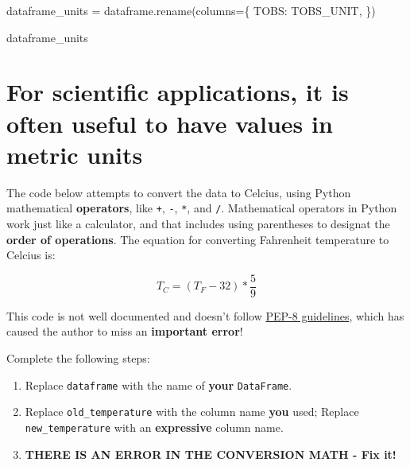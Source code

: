\documentclass[
  letterpaper,
  DIV=11,
  numbers=noendperiod,
  oneside]{scrreprt}
\newenvironment{Shaded}{\begin{snugshade}}{\end{snugshade}}
\newcommand{\NormalTok}[1]{\textcolor[rgb]{0.00,0.23,0.31}{#1}}
\newcommand{\OperatorTok}[1]{\textcolor[rgb]{0.37,0.37,0.37}{#1}}
\newcommand{\StringTok}[1]{\textcolor[rgb]{0.13,0.47,0.30}{#1}}
\providecommand{\tightlist}{%
  \setlength{\itemsep}{0pt}\setlength{\parskip}{0pt}}
\begin{document}
\begin{Shaded}
\begin{Highlighting}[]
\NormalTok{dataframe\_units }\OperatorTok{=}\NormalTok{ dataframe.rename(columns}\OperatorTok{=}\NormalTok{\{}
    \StringTok{\textquotesingle{}TOBS\textquotesingle{}}\NormalTok{: }\StringTok{\textquotesingle{}TOBS\_UNIT\textquotesingle{}}\NormalTok{,}
\NormalTok{\})}

\NormalTok{dataframe\_units}
\end{Highlighting}
\end{Shaded}

\section{For scientific applications, it is often useful to have values
in metric
units}\label{for-scientific-applications-it-is-often-useful-to-have-values-in-metric-units-1}

\begin{tcolorbox}[enhanced jigsaw, colbacktitle=quarto-callout-color!10!white, opacityback=0, bottomtitle=1mm, toptitle=1mm, bottomrule=.15mm, left=2mm, colframe=quarto-callout-color-frame, leftrule=.75mm, opacitybacktitle=0.6, colback=white, rightrule=.15mm, toprule=.15mm, breakable, titlerule=0mm, title=\textcolor{quarto-callout-color}{\faInfo}\hspace{0.5em}{Try It: Convert units}, coltitle=black, arc=.35mm]

The code below attempts to convert the data to Celcius, using Python
mathematical \textbf{operators}, like \texttt{+}, \texttt{-},
\texttt{*}, and \texttt{/}. Mathematical operators in Python work just
like a calculator, and that includes using parentheses to designat the
\textbf{order of operations}. The equation for converting Fahrenheit
temperature to Celcius is:

\[ T_C = (T_F - 32) * \frac{5}{9} \]

This code is not well documented and doesn't follow
\href{https://peps.python.org/pep-0008/\#other-recommendations}{PEP-8
guidelines}, which has caused the author to miss an \textbf{important
error}!

Complete the following steps:

\begin{enumerate}
\def\labelenumi{\arabic{enumi}.}
\tightlist
\item
  Replace \texttt{dataframe} with the name of \textbf{your}
  \texttt{DataFrame}.
\item
  Replace \texttt{\textquotesingle{}old\_temperature\textquotesingle{}}
  with the column name \textbf{you} used; Replace
  \texttt{\textquotesingle{}new\_temperature\textquotesingle{}} with an
  \textbf{expressive} column name.
\item
  \textbf{THERE IS AN ERROR IN THE CONVERSION MATH - Fix it!}
\end{enumerate}

\end{tcolorbox}
\end{document}
